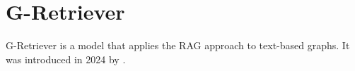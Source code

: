 \section{G-Retriever}

G-Retriever is a model that applies the RAG approach to text-based graphs.
It was introduced in 2024 by \cite{g-retriever}.